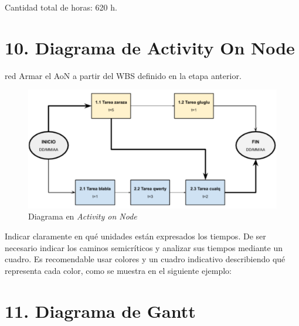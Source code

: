 \documentclass[
11pt, %
]{charter}
\begin{document}
Cantidad total de horas: 620 h.

\section{10. Diagrama de Activity On Node}
\label{sec:AoN}

\begin{consigna}{red}
Armar el AoN a partir del WBS definido en la etapa anterior. 



\end{consigna}

\begin{figure}[htpb]
\centering 
\includegraphics[width=.8\textwidth]{./Figuras/AoN.png}
\caption{Diagrama en \textit{Activity on Node}}
\label{fig:AoN}
\end{figure}

Indicar claramente en qué unidades están expresados los tiempos.
De ser necesario indicar los caminos semicríticos y analizar sus tiempos mediante un cuadro.
Es recomendable usar colores y un cuadro indicativo describiendo qué representa cada color, como se muestra en el siguiente ejemplo:



\section{11. Diagrama de Gantt}
\label{sec:gantt}
\end{document}
